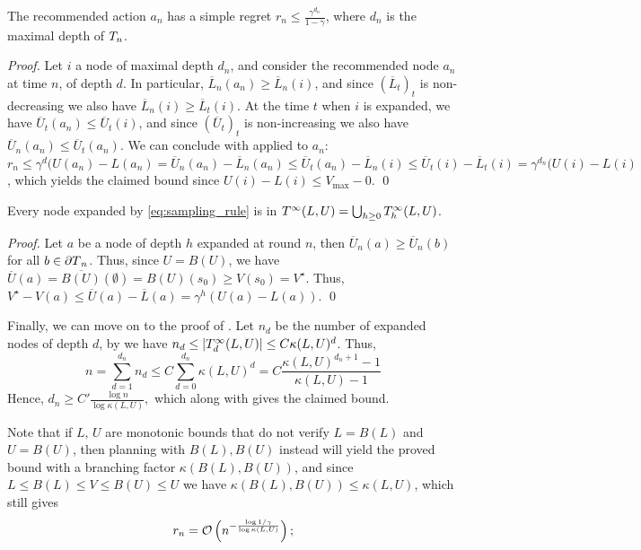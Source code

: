 \documentclass[runningheads]{llncs}
\begin{document}
\begin{lemma}[Recommendation]
	\label{lem:recommendation-bound-U}
The recommended action $a_n$ has a simple regret $r_n \leq \frac{\gamma^{d_n}}{1-\gamma}$, where $d_n$ is the maximal depth of $T_n$.
\end{lemma}
\begin{proof}
Let $i$ a node of maximal depth $d_n$, and consider the recommended node $a_n$ at time $n$, of depth $d$. In particular, $\overline{L}_n(a_n) \geq \overline{L}_n(i)$, and since $(\overline{L}_t)_t$ is non-decreasing we also have $\overline{L}_n(i) \geq \overline{L}_t(i)$. At the time $t$ when $i$ is expanded, we have $\overline{U}_t(a_n) \leq \overline{U}_t(i)$, and since $(\overline{U}_t)_t$ is non-increasing we also have $\overline{U}_n(a_n) \leq \overline{U}_t(a_n)$. We can conclude with  applied to $a_n$: $r_n \leq \gamma^d(U(a_n)-L(a_n) = \overline{U}_n(a_n) - \overline{L}_n(a_n)  \leq \overline{U}_t(a_n) - \overline{L}_n(i) \leq \overline{U}_t(i) - \overline{L}_t(i) = \gamma^{d_n}(U(i) - L(i)$, which yields the claimed bound since $U(i) - L(i) \leq V_{\max}-0$.
\qed\end{proof}

\begin{lemma}
\label{lem:near-optimal-nodes-U}
Every node expanded by \eqref{eq:sampling_rule} is in $T^\infty(L,U) = \bigcup_{h\geq 0} T^\infty_h(L,U)$.
\end{lemma}
\begin{proof}
Let $a$ be a node of depth $h$ expanded at round $n$, then $\overline{U}_n(a) \geq \overline{U}_n(b)$ for all $b\in{\partial T}_n$. Thus, since $U = B(U)$, we have $\overline{U}(a) = \overline{B(U)}(\emptyset) = B(U)(s_0) \geq V(s_0) = V^\star$. Thus, $V^\star - V(a) \leq \overline{U}(a) - \overline{L}(a) = \gamma^h(U(a) - L(a))$.
\qed\end{proof}

Finally, we can move on to the proof of .
Let $n_d$ be the number of expanded nodes of depth $d$, by  we have $n_d \leq |T^\infty_d(L,U)| \leq C\kappa(L,U)^d$. Thus, 
\[n = \sum_{d=1}^{d_n} n_d \leq C\sum_{d=0}^{d_n} \kappa(L,U)^d = C\frac{\kappa(L,U)^{d_n+1}-1}{\kappa(L,U)-1}\]
Hence, $d_n \geq C'\frac{\log n}{\log\kappa(L,U)},$ which along with  gives the claimed bound.

Note that if $L,\,U$ are monotonic bounds that do not verify $L = B(L)$ and $U=B(U)$, then planning with $B(L),B(U)$ instead will yield the proved bound with a branching factor $\kappa(B(L),B(U))$, and since $L\leq B(L)\leq V\leq B(U)\leq U$ we have $\kappa(B(L),B(U)) \leq \kappa(L,U)$, which still gives \begin{align*}
r_n = \mathcal{O}\left(n^{-\frac{\log 1/\gamma}{\log \kappa(L,U)}}\right);
\end{align*}
\end{document}
